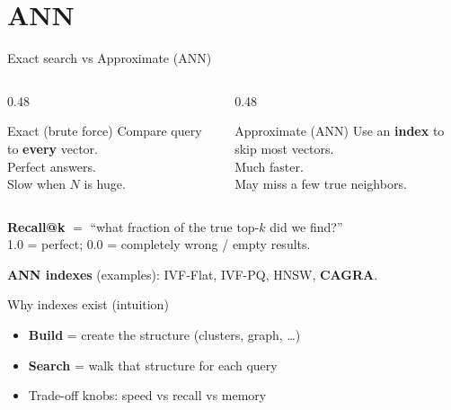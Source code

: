 \documentclass[aspectratio=169,11pt]{beamer}
\begin{document}
\section{ANN}
\begin{frame}{Exact search vs Approximate (ANN)}
  \begin{columns}[T]
    \begin{column}{0.48\textwidth}
      \begin{block}{Exact (brute force)}
        Compare query to \textbf{every} vector.\\
        Perfect answers.\\
        Slow when $N$ is huge.
      \end{block}
    \end{column}
    \begin{column}{0.48\textwidth}
      \begin{block}{Approximate (ANN)}
        Use an \textbf{index} to skip most vectors.\\
        Much faster.\\
        May miss a few true neighbors.
      \end{block}
    \end{column}
  \end{columns}

  \vspace{0.8em}
  \textbf{Recall@k} $=$ ``what fraction of the true top-$k$ did we find?''\\
  {\footnotesize 1.0 = perfect; 0.0 = completely wrong / empty results.}

  \vspace{0.6em}
  \textbf{ANN indexes} (examples): IVF-Flat, IVF-PQ, HNSW, \textbf{CAGRA}.
\end{frame}

\begin{frame}{Why indexes exist (intuition)}
  \begin{center}
  \end{center}

  \vspace{1em}
  \begin{itemize}
    \item \textbf{Build} = create the structure (clusters, graph, \ldots)
    \item \textbf{Search} = walk that structure for each query
    \item Trade-off knobs: speed vs recall vs memory
  \end{itemize}
\end{frame}
\end{document}
